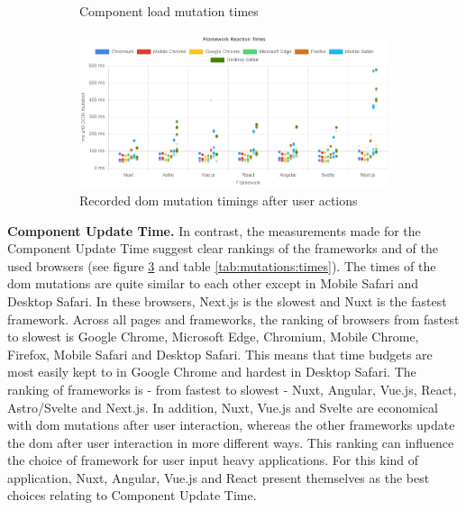\documentclass[a4paper, 12pt]{article}
\begin{document}
\begin{figure}[!h]
\begin{subfigure}{0.49\linewidth}
\begin{center}
    \end{center}
    \caption{Component load mutation times}
    \label{fig:Playwright:pageLoadMutations:total}
  \end{subfigure}
  \begin{subfigure}{0.49\linewidth}
    \begin{center}
      \includegraphics[width=\linewidth, keepaspectratio]{img/playwright-results/userActions_byUserAction/total.png}
    \end{center}
    \caption{Recorded \acrshort{dom} mutation timings after user actions}
    \label{fig:playwrightResults:total}
  \end{subfigure}
  \caption{}
\end{figure}

\pagebreak

\textbf{Component Update Time.} In contrast, the measurements made for the Component Update Time suggest clear rankings of the frameworks and of the used browsers (see figure \ref{fig:playwrightResults:total} and table \ref{tab:mutations:times}).
The times of the \acrshort{dom} mutations are quite similar to each other except in Mobile Safari and Desktop Safari.
In these browsers, Next.js is the slowest and Nuxt is the fastest framework.
Across all pages and frameworks, the ranking of browsers from fastest to slowest is Google Chrome, Microsoft Edge, Chromium, Mobile Chrome, Firefox, Mobile Safari and Desktop Safari.
This means that time budgets are most easily kept to in Google Chrome and hardest in Desktop Safari.
The ranking of frameworks is - from fastest to slowest - Nuxt, Angular, Vue.js, React, Astro/Svelte and Next.js.
In addition, Nuxt, Vue.js and Svelte are economical with \acrshort{dom} mutations after user interaction, whereas the other frameworks update the \acrshort{dom} after user interaction in more different ways.
This ranking can influence the choice of framework for user input heavy applications.
For this kind of application, Nuxt, Angular, Vue.js and React present themselves as the best choices relating to Component Update Time.
\end{document}
